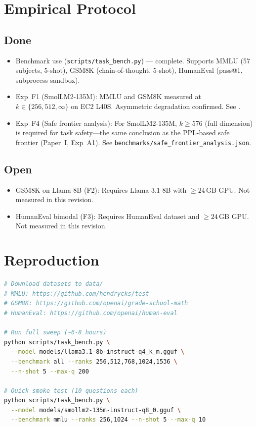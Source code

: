 \documentclass[11pt]{article}
\begin{document}
\section{Empirical Protocol}
\label{sec:protocol}

\subsection{Done}
\begin{itemize}
\item Benchmark use (\texttt{scripts/task\_bench.py}) --- complete.
      Supports MMLU (57 subjects, 5-shot), GSM8K (chain-of-thought,
      5-shot), HumanEval (pass@1, subprocess sandbox).
\item Exp~F1 (SmolLM2-135M): MMLU and GSM8K measured at
      $k\in\{256,512,\infty\}$ on EC2 L40S.  Asymmetric degradation
      confirmed.  See .
\item Exp~F4 (Safe frontier analysis): For SmolLM2-135M,
      $k{\ge}576$ (full dimension) is required for task safety---the
      same conclusion as the PPL-based safe frontier (Paper~I, Exp~A1).
      See \texttt{benchmarks/safe\_frontier\_analysis.json}.
\end{itemize}

\subsection{Open}
\begin{itemize}
\item GSM8K on Llama-8B (F2): Requires Llama-3.1-8B with
      $\ge 24$\,GB GPU.  Not measured in this revision.
\item HumanEval bimodal (F3): Requires HumanEval dataset
      and $\ge 24$\,GB GPU.  Not measured in this revision.
\end{itemize}

\section{Reproduction}
\label{sec:repro}

\begin{lstlisting}[language=bash]
# Download datasets to data/
# MMLU: https://github.com/hendrycks/test
# GSM8K: https://github.com/openai/grade-school-math
# HumanEval: https://github.com/openai/human-eval

# Run full sweep (~6-8 hours)
python scripts/task_bench.py \
  --model models/llama3.1-8b-instruct-q4_k_m.gguf \
  --benchmark all --ranks 256,512,768,1024,1536 \
  --n-shot 5 --max-q 200

# Quick smoke test (10 questions each)
python scripts/task_bench.py \
  --model models/smollm2-135m-instruct-q8_0.gguf \
  --benchmark mmlu --ranks 256,1024 --n-shot 5 --max-q 10
\end{lstlisting}
\end{document}
